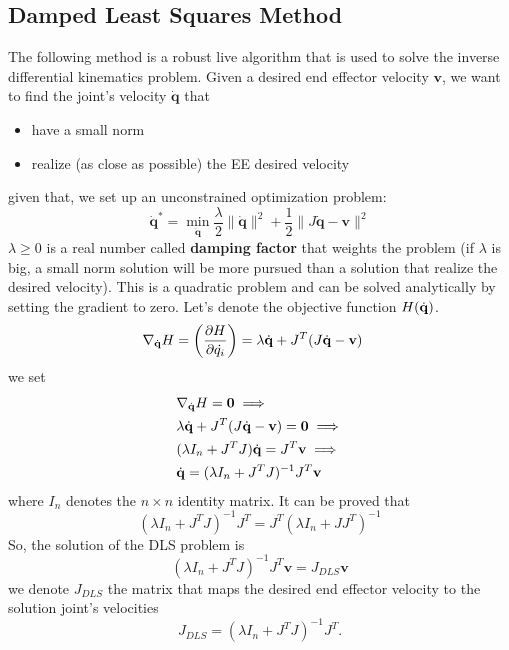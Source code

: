 \documentclass[10pt, letterpaper]{report}
\begin{document}
\subsection{Damped Least Squares Method}
The following method is a robust live algorithm that is used to solve the inverse differential kinematics problem. Given a desired end effector velocity $\mathbf v$, we want to find the joint's velocity $\dot {\mathbf q}$ that \begin{itemize}
    \item have a small norm 
    \item realize (as close as possible) the EE desired velocity
\end{itemize}
given that, we set up an unconstrained optimization problem:\begin{equation}
    \dot{\mathbf q}^*=\min_{\dot{\mathbf q}} \frac{\lambda}{2}\|\dot{\mathbf q} \|^2+\frac{1}{2}\|J\dot{\mathbf q}-\mathbf v\|^2
\end{equation}
$\lambda\ge 0$ is a real number called \textbf{damping factor}  that weights the problem (if $\lambda$ is big, a small norm solution will be more pursued than a solution that realize the desired velocity). This is a quadratic problem and can be solved analytically by setting the gradient to zero. Let's denote the objective function $H({\dot{\mathbf q}})$.
\begin{align}
    &\nabla_{{\dot{\mathbf q}}} H = \left(\frac{\partial H}{\partial \dot{ q_i}}\right)=\lambda{\dot{\mathbf q}}+J^T(J{\dot{\mathbf q}}-\mathbf v)\end{align}
we set\begin{align}
    &\nabla_{{\dot{\mathbf q}}} H = \mathbf 0 \implies \\ 
    &\lambda{\dot{\mathbf q}}+J^T(J{\dot{\mathbf q}}-\mathbf v)=\mathbf 0\implies \\ 
    &(\lambda I_n+J^TJ){\dot{\mathbf q}}=J^T\mathbf v\implies \\ 
    &{\dot{\mathbf q}}=(\lambda I_n+J^TJ)^{-1}J^T\mathbf v
\end{align}
where $I_n$ denotes the $n\times n$ identity matrix. It can be proved that \begin{equation}
    (\lambda I_n+J^TJ)^{-1}J^T=J^T(\lambda I_n+JJ^T)^{-1}
\end{equation}
So, the solution of the DLS problem is\begin{equation}
    (\lambda I_n+J^TJ)^{-1}J^T\mathbf v=J_{DLS}\mathbf v
\end{equation}
we denote $J_{DLS}$ the matrix that maps the desired end effector velocity to the solution joint's velocities\begin{equation}
     J_{DLS}=(\lambda I_n+J^TJ)^{-1}J^T.
\end{equation}
\end{document}
